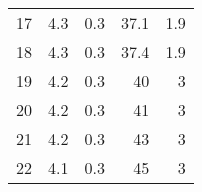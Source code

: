 \begin{tabular}{lrrrr}
	17 & 4.3                & 0.3                       & 37.1              & 1.9                      \\
	18 & 4.3                & 0.3                       & 37.4              & 1.9                      \\
	19 & 4.2                & 0.3                       & 40                & 3                        \\
	20 & 4.2                & 0.3                       & 41                & 3                        \\
	21 & 4.2                & 0.3                       & 43                & 3                        \\
	22 & 4.1                & 0.3                       & 45                & 3                        \\
	\bottomrule
\end{tabular}
